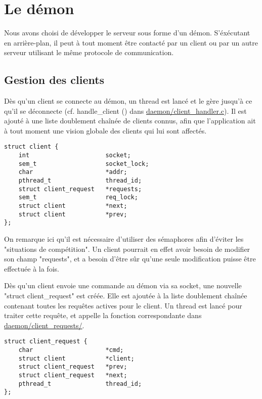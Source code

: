 
\chapter{Le démon}
    Nous avons choisi de développer le serveur sous forme d'un démon.
S'éxécutant en arrière-plan, il peut à tout moment être contacté par un client
ou par un autre serveur utilisant le même protocole de communication.

    \section{Gestion des clients}
    Dès qu'un client se connecte au démon, un thread est lancé et le gère
jusqu'à ce qu'il se déconnecte (cf. handle\_client () dans
\url{daemon/client_handler.c}). Il est ajouté à une liste doublement chaînée de 
clients connus, afin que l'application ait à tout moment une vision globale des 
clients qui lui sont affectés. 

\begin{lstlisting}
struct client {
    int                     socket;
    sem_t                   socket_lock;
    char                    *addr;
    pthread_t               thread_id;
    struct client_request   *requests;
    sem_t                   req_lock;
    struct client           *next;
    struct client           *prev;
};
\end{lstlisting}

    On remarque ici qu'il est nécessaire d'utiliser des sémaphores afin d'éviter
les "situations de compétition". Un client pourrait en effet avoir besoin de
modifier son champ "requests", et a besoin d'être sûr qu'une seule modification
puisse être effectuée à la fois.

    Dès qu'un client envoie une commande au démon via sa socket, une nouvelle
"struct client\_request" est créée. Elle est ajoutée à la liste doublement
chaînée contenant toutes les requêtes actives pour le client. Un thread est
lancé pour traiter cette requête, et appelle la fonction correspondante dans
\url{daemon/client_requests/}.



\begin{lstlisting}
struct client_request {
    char                    *cmd;
    struct client           *client;
    struct client_request   *prev;
    struct client_request   *next;
    pthread_t               thread_id;
};
\end{lstlisting}


